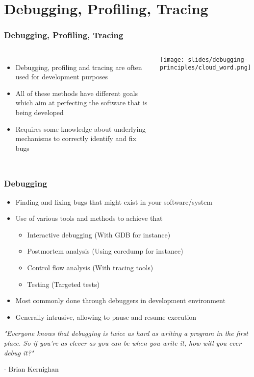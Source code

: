 \section{Debugging, Profiling, Tracing}

\begin{frame}
\frametitle{Debugging, Profiling, Tracing}
  \begin{columns}[T]
    \begin{itemize}
      \item Debugging, profiling and tracing are often used for development purposes
      \item All of these methods have different goals which aim at perfecting the
            software that is being developed
      \item Requires some knowledge about underlying mechanisms to correctly identify
            and fix bugs
    \end{itemize}
    \vspace{0.5cm}
    \texttt{[image: slides/debugging-principles/cloud\_word.png]}
  \end{columns}
\end{frame}

\begin{frame}
  \frametitle{Debugging}
  \begin{itemize}
    \item Finding and fixing bugs that might exist in your software/system
    \item Use of various tools and methods to achieve that
    \begin{itemize}
      \item Interactive debugging (With GDB for instance)
      \item Postmortem analysis (Using coredump for instance)
      \item Control flow analysis (With tracing tools)
      \item Testing (Targeted tests)
    \end{itemize}
    \item Most commonly done through debuggers in development environment
    \item Generally intrusive, allowing to pause and resume execution
  \end{itemize}
  \vspace{0.5cm}

  {\small \em "Everyone knows that debugging is twice as hard as writing a program in the first place. So if you're as
    clever as you can be when you write it, how will you ever debug it?" 

  - Brian Kernighan }

\end{frame}

